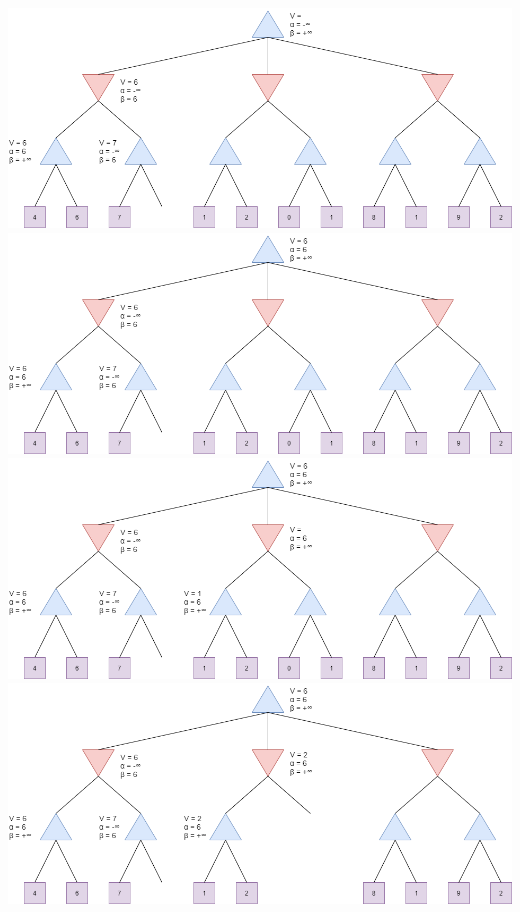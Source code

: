 \documentclass[]{scrreprt}
\begin{document}
\includegraphics[scale=0.45]{step4} \newline \newline \newline
\includegraphics[scale=0.45]{step5} \newline \newline
\includegraphics[scale=0.45]{step6} \newline \newline \newline
\includegraphics[scale=0.45]{step7} \newline \newline
\end{document}
